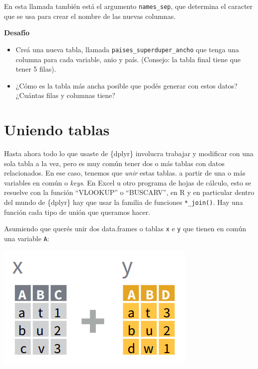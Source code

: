 \documentclass[
  openany]{book}
\begin{document}
En esta llamada también está el argumento \texttt{names\_sep}, que determina el caracter que se usa para crear el nombre de las nuevas columnas.

\textbf{Desafío}

\begin{itemize}
\item
  Creá una nueva tabla, llamada \texttt{paises\_superduper\_ancho} que tenga una columna para cada variable, anio y país.
  (Consejo: la tabla final tiene que tener 5 filas).
\item
  ¿Cómo es la tabla más ancha posible que podés generar con estos datos?
  ¿Cuántas filas y columnas tiene?
\end{itemize}

\hypertarget{uniendo-tablas}{%
\section{Uniendo tablas}\label{uniendo-tablas}}

Hasta ahora todo lo que usaste de \{dplyr\} involucra trabajar y modificar con una sola tabla a la vez, pero es muy común tener dos o más tablas con datos relacionados.
En ese caso, tenemos que \emph{unir} estas tablas.
a partir de una o más variables en común o \emph{keys}.
En Excel u otro programa de hojas de cálculo, esto se resuelve con la función ``VLOOKUP'' o ``BUSCARV'', en R y en particular dentro del mundo de \{dplyr\} hay que usar la familia de funciones \texttt{*\_join()}.
Hay una función cada tipo de unión que queramos hacer.

Asumiendo que querés unir dos data.frames o tablas \texttt{x} e \texttt{y} que tienen en común una variable \texttt{A}:

\includegraphics{img/join.png}
\end{document}
